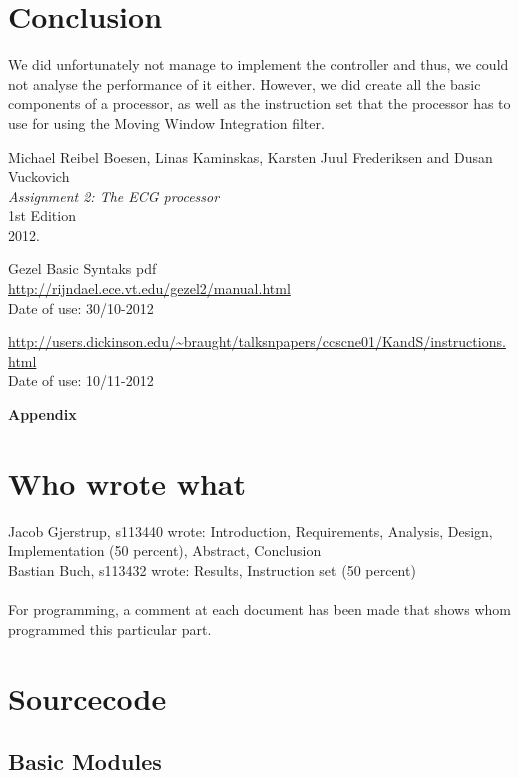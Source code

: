 \documentclass[12pt,a4paper]{article}
\begin{document}
\section{Conclusion}
	We did unfortunately not manage to implement the controller and thus, we could not analyse the performance of it either. However, we did create all the basic components of a processor, as well as the instruction set that the processor has to use for using the Moving Window Integration filter.
\newpage
\begin{thebibliography}{9}

  Michael Reibel Boesen, Linas Kaminskas, Karsten Juul Frederiksen and Dusan Vuckovich\\
  \emph{Assignment 2: The ECG processor}\\
  1st Edition\\
  2012.

	Gezel Basic Syntaks pdf\\

	\url{http://rijndael.ece.vt.edu/gezel2/manual.html} \\
	Date of use: 30/10-2012

	\url{http://users.dickinson.edu/~braught/talksnpapers/ccscne01/KandS/instructions.html} \\
	Date of use: 10/11-2012
\end{thebibliography}
	
\newpage	
	\begin{Large}
		\textbf{Appendix}
	\end{Large}
	\appendix

\section{Who wrote what}
Jacob Gjerstrup, s113440 wrote: Introduction, Requirements, Analysis, Design, Implementation (50 percent), Abstract, Conclusion\\
Bastian Buch, s113432 wrote: Results, Instruction set (50 percent)\\
\\
For programming, a comment at each document has been made that shows whom programmed this particular part.
	
\section{Sourcecode}
\subsection{Basic Modules}
\end{document}
